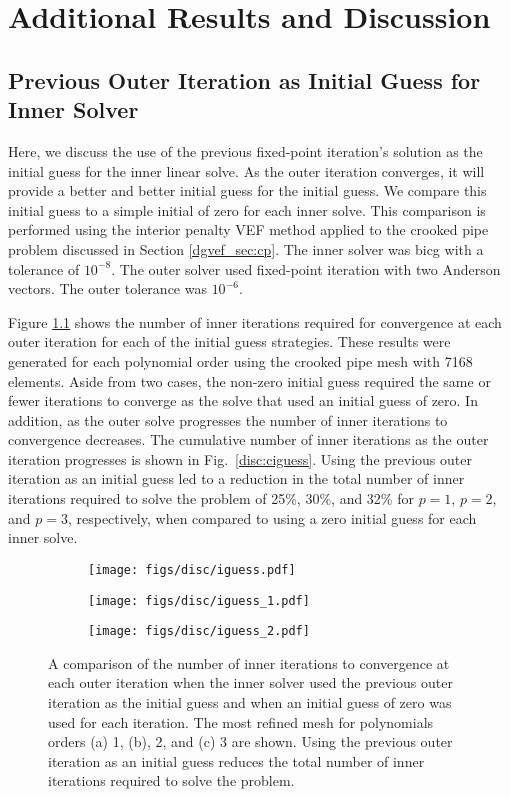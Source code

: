 \documentclass[../doc.tex]{subfiles}
\begin{document}
\chapter{Additional Results and Discussion}
\section{Previous Outer Iteration as Initial Guess for Inner Solver}
Here, we discuss the use of the previous fixed-point iteration's solution as the initial guess for the inner linear solve. As the outer iteration converges, it will provide a better and better initial guess for the initial guess. We compare this initial guess to a simple initial of zero for each inner solve. This comparison is performed using the interior penalty VEF method applied to the crooked pipe problem discussed in Section \ref{dgvef_sec:cp}. The inner solver was \gls{bicg} with a tolerance of $10^{-8}$. The outer solver used fixed-point iteration with two Anderson vectors. The outer tolerance was $10^{-6}$. 

Figure \ref{disc:iguess} shows the number of inner iterations required for convergence at each outer iteration for each of the initial guess strategies. These results were generated for each polynomial order using the crooked pipe mesh with 7168 elements. Aside from two cases, the non-zero initial guess required the same or fewer iterations to converge as the solve that used an initial guess of zero. In addition, as the outer solve progresses the number of inner iterations to convergence decreases. The cumulative number of inner iterations as the outer iteration progresses is shown in Fig.~\ref{disc:ciguess}. Using the previous outer iteration as an initial guess led to a reduction in the total number of inner iterations required to solve the problem of 25\%, 30\%, and 32\%  for $p=1$, $p=2$, and $p=3$, respectively, when compared to using a zero initial guess for each inner solve. 
\begin{figure}
\centering 
\begin{subfigure}{.32\textwidth}
	\centering
	\texttt{[image: figs/disc/iguess.pdf]}
	\caption{}
\end{subfigure}
\begin{subfigure}{.32\textwidth}
	\centering
	\texttt{[image: figs/disc/iguess\_1.pdf]}
	\caption{}
\end{subfigure}
\begin{subfigure}{.32\textwidth}
	\centering
	\texttt{[image: figs/disc/iguess\_2.pdf]}
	\caption{}
\end{subfigure}
\caption{A comparison of the number of inner iterations to convergence at each outer iteration when the inner solver used the previous outer iteration as the initial guess and when an initial guess of zero was used for each iteration. The most refined mesh for polynomials orders (a) 1, (b), 2, and (c) 3 are shown. Using the previous outer iteration as an initial guess reduces the total number of inner iterations required to solve the problem.}
\label{disc:iguess}
\end{figure}
\end{document}
